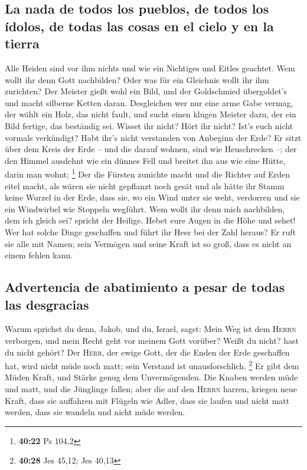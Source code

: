 \hypertarget{la-nada-de-todos-los-pueblos-de-todos-los-uxeddolos-de-todas-las-cosas-en-el-cielo-y-en-la-tierra}{%
\subsection{La nada de todos los pueblos, de todos los ídolos, de todas
las cosas en el cielo y en la
tierra}\label{la-nada-de-todos-los-pueblos-de-todos-los-uxeddolos-de-todas-las-cosas-en-el-cielo-y-en-la-tierra}}

 Alle Heiden sind vor ihm nichts und wie ein Nichtiges
und Eitles geachtet.  Wem wollt ihr denn Gott nachbilden?
Oder was für ein Gleichnis wollt ihr ihm zurichten?  Der
Meister gießt wohl ein Bild, und der Goldschmied übergoldet's und macht
silberne Ketten daran.  Desgleichen wer nur eine arme
Gabe vermag, der wählt ein Holz, das nicht fault, und sucht einen klugen
Meister dazu, der ein Bild fertige, das beständig sei. 
Wisset ihr nicht? Hört ihr nicht? Ist's euch nicht vormals verkündigt?
Habt ihr's nicht verstanden von Anbeginn der Erde?  Er
sitzt über dem Kreis der Erde -- und die darauf wohnen, sind wie
Heuschrecken --; der den Himmel ausdehnt wie ein dünnes Fell und breitet
ihn aus wie eine Hütte, darin man wohnt; \footnote{\textbf{40:22} Ps
  104,2}  Der die Fürsten zunichte macht und die Richter
auf Erden eitel macht,  als wären sie nicht gepflanzt
noch gesät und als hätte ihr Stamm keine Wurzel in der Erde, dass sie,
wo ein Wind unter sie weht, verdorren und sie ein Windwirbel wie
Stoppeln wegführt.  Wem wollt ihr denn mich nachbilden,
dem ich gleich sei? spricht der Heilige.  Hebet eure
Augen in die Höhe und sehet! Wer hat solche Dinge geschaffen und führt
ihr Heer bei der Zahl heraus? Er ruft sie alle mit Namen; sein Vermögen
und seine Kraft ist so groß, dass es nicht an einem fehlen kann.

\hypertarget{advertencia-de-abatimiento-a-pesar-de-todas-las-desgracias}{%
\subsection{Advertencia de abatimiento a pesar de todas las
desgracias}\label{advertencia-de-abatimiento-a-pesar-de-todas-las-desgracias}}

 Warum sprichst du denn, Jakob, und du, Israel, sagst:
Mein Weg ist dem \textsc{Herrn} verborgen, und mein Recht geht vor
meinem Gott vorüber?  Weißt du nicht? hast du nicht
gehört? Der \textsc{Herr}, der ewige Gott, der die Enden der Erde
geschaffen hat, wird nicht müde noch matt; sein Verstand ist
unausforschlich. \footnote{\textbf{40:28} Jes 45,12; Jes 40,13}
 Er gibt dem Müden Kraft, und Stärke genug dem
Unvermögenden.  Die Knaben werden müde und matt, und die
Jünglinge fallen;  aber die auf den \textsc{Herrn}
harren, kriegen neue Kraft, dass sie auffahren mit Flügeln wie Adler,
dass sie laufen und nicht matt werden, dass sie wandeln und nicht müde
werden.

